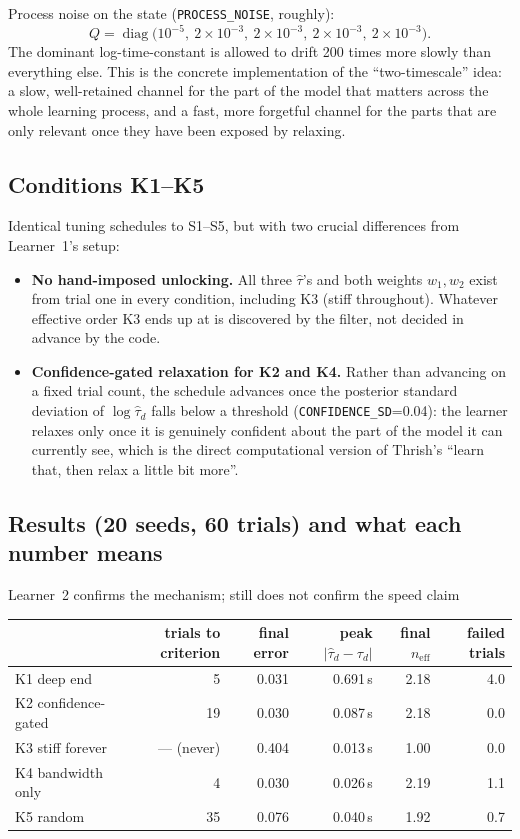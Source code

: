 \documentclass[11pt,a4paper]{article}
\newcommand{\neff}{n_{\mathrm{eff}}}
\DeclareMathOperator{\diag}{diag}
\begin{document}
Process noise on the state (\texttt{PROCESS\_NOISE}, roughly):
\[
Q = \diag\bigl(10^{-5},\ 2\times10^{-3},\ 2\times10^{-3},\ 2\times10^{-3},\ 2\times10^{-3}\bigr).
\]
The dominant log-time-constant is allowed to drift 200 times more slowly than
everything else. This is the concrete implementation of the ``two-timescale''
idea: a slow, well-retained channel for the part of the model that matters
across the whole learning process, and a fast, more forgetful channel for the
parts that are only relevant once they have been exposed by relaxing.

\subsection{Conditions K1--K5}

Identical tuning schedules to S1--S5, but with two crucial differences from
Learner~1's setup:
\begin{itemize}[nosep]
\item \textbf{No hand-imposed unlocking.} All three $\hat\tau$'s and both
  weights $w_1,w_2$ exist from trial one in every condition, including K3
  (stiff throughout). Whatever effective order K3 ends up at is discovered by
  the filter, not decided in advance by the code.
\item \textbf{Confidence-gated relaxation for K2 and K4.} Rather than
  advancing on a fixed trial count, the schedule advances once the
  posterior standard deviation of $\log\hat\tau_d$ falls below a threshold
  (\texttt{CONFIDENCE\_SD}=0.04): the learner relaxes only once it is
  genuinely confident about the part of the model it can currently see, which
  is the direct computational version of Thrish's ``learn that, then relax a
  little bit more''.
\end{itemize}

\subsection{Results (20 seeds, 60 trials) and what each number means}
\label{sec:learner2results}

\begin{resultbox}{Learner~2 confirms the mechanism; still does not confirm the speed claim}
\begin{center}
\begin{tabular}{@{}lrrrrr@{}}
\toprule
 & trials to criterion & final error & peak $|\hat\tau_d-\tau_d|$ & final $\neff$ & failed trials \\
\midrule
K1 deep end & 5 & 0.031 & 0.691\,s & 2.18 & 4.0 \\
K2 confidence-gated & 19 & 0.030 & 0.087\,s & 2.18 & 0.0 \\
K3 stiff forever & --- (never) & 0.404 & 0.013\,s & 1.00 & 0.0 \\
K4 bandwidth only & 4 & 0.030 & 0.026\,s & 2.19 & 1.1 \\
K5 random & 35 & 0.076 & 0.040\,s & 1.92 & 0.7 \\
\bottomrule
\end{tabular}
\end{center}
\end{resultbox}
\end{document}
